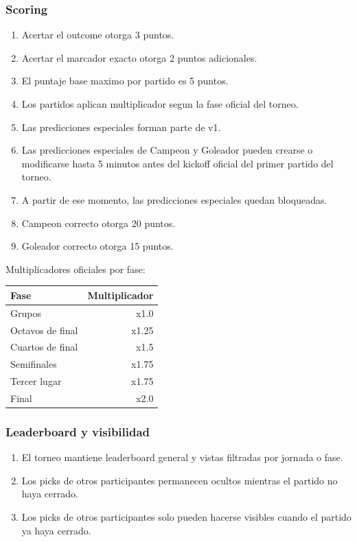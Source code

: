 \subsubsection{Scoring}

\begin{enumerate}
  \item Acertar el outcome otorga 3 puntos.
  \item Acertar el marcador exacto otorga 2 puntos adicionales.
  \item El puntaje base maximo por partido es 5 puntos.
  \item Los partidos aplican multiplicador segun la fase oficial del torneo.
  \item Las predicciones especiales forman parte de v1.
  \item Las predicciones especiales de Campeon y Goleador pueden crearse o modificarse hasta 5 minutos antes del kickoff oficial del primer partido del torneo.
  \item A partir de ese momento, las predicciones especiales quedan bloqueadas.
  \item Campeon correcto otorga 20 puntos.
  \item Goleador correcto otorga 15 puntos.
\end{enumerate}

Multiplicadores oficiales por fase:

\begin{center}
\begin{tabular}{lr}
\toprule
Fase & Multiplicador \\
\midrule
Grupos & x1.0 \\
Octavos de final & x1.25 \\
Cuartos de final & x1.5 \\
Semifinales & x1.75 \\
Tercer lugar & x1.75 \\
Final & x2.0 \\
\bottomrule
\end{tabular}
\end{center}

\subsubsection{Leaderboard y visibilidad}

\begin{enumerate}
  \item El torneo mantiene leaderboard general y vistas filtradas por jornada o fase.
  \item Los picks de otros participantes permanecen ocultos mientras el partido no haya cerrado.
  \item Los picks de otros participantes solo pueden hacerse visibles cuando el partido ya haya cerrado.
\end{enumerate}

